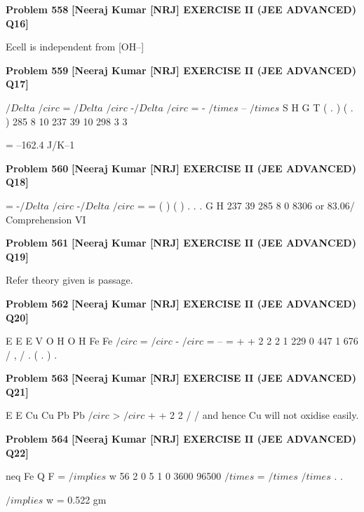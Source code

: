 \begin{problembox}
\textbf{Problem 558} \hfill \textbf{[Neeraj Kumar [NRJ] EXERCISE II (JEE ADVANCED) Q16]}
\label{q:ext-nrj_all_questions-558}

Ecell is independent from [OH--]
\end{problembox}

\begin{problembox}
\textbf{Problem 559} \hfill \textbf{[Neeraj Kumar [NRJ] EXERCISE II (JEE ADVANCED) Q17]}
\label{q:ext-nrj_all_questions-559}

$/Delta$ $/circ$ = $/Delta$
$/circ$ -$/Delta$
$/circ$
= -
$/times$
--
$/times$
S
H
G
T
(
.
)
(
.
)
285 8 10
237 39 10
298
3
3
 
         = --162.4 J/K--1
\end{problembox}

\begin{problembox}
\textbf{Problem 560} \hfill \textbf{[Neeraj Kumar [NRJ] EXERCISE II (JEE ADVANCED) Q18]}
\label{q:ext-nrj_all_questions-560}

  = -$/Delta$
$/circ$
-$/Delta$
$/circ$ =
=
(
)
(
)
.
.
.
G
H
237 39
285 8
0 8306 or 83.06/%
Comprehension VI
\end{problembox}

\begin{problembox}
\textbf{Problem 561} \hfill \textbf{[Neeraj Kumar [NRJ] EXERCISE II (JEE ADVANCED) Q19]}
\label{q:ext-nrj_all_questions-561}

Refer theory given is passage.
\end{problembox}

\begin{problembox}
\textbf{Problem 562} \hfill \textbf{[Neeraj Kumar [NRJ] EXERCISE II (JEE ADVANCED) Q20]}
\label{q:ext-nrj_all_questions-562}

E
E
E
V
O
H O H
Fe
Fe
$/circ$ =
$/circ$
-
$/circ$
=
--
=
+
+
2
2
2
1 229
0 447
1 676
/
,
/
.
(
.
)
.
\end{problembox}

\begin{problembox}
\textbf{Problem 563} \hfill \textbf{[Neeraj Kumar [NRJ] EXERCISE II (JEE ADVANCED) Q21]}
\label{q:ext-nrj_all_questions-563}

E
E
Cu
Cu
Pb
Pb
$/circ$
>
$/circ$
+
+
2
2
/
/
 and hence Cu will not 
oxidise easily.
\end{problembox}

\begin{problembox}
\textbf{Problem 564} \hfill \textbf{[Neeraj Kumar [NRJ] EXERCISE II (JEE ADVANCED) Q22]}
\label{q:ext-nrj_all_questions-564}

neq Fe
Q
F
=
 $/implies$ w
56
2
0 5 1 0
3600
96500
$/times$
=
$/times$
$/times$
.
.
 
 
 $/implies$ w = 0.522 gm
\end{problembox}

